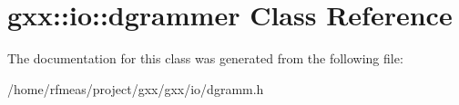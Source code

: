 \hypertarget{classgxx_1_1io_1_1dgrammer}{}\section{gxx\+:\+:io\+:\+:dgrammer Class Reference}
\label{classgxx_1_1io_1_1dgrammer}


The documentation for this class was generated from the following file\+:\begin{DoxyCompactItemize}
\item 
/home/rfmeas/project/gxx/gxx/io/dgramm.\+h\end{DoxyCompactItemize}
